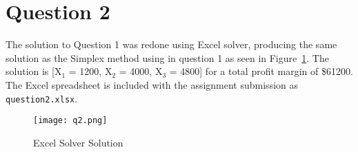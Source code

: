 \section*{Question 2}
The solution to Question 1 was redone using Excel solver, producing the same solution as the Simplex method using in question 1 as seen in Figure~\ref{fig:q2}. The solution is [X$_1$ = 1200, X$_2$ = 4000, X$_3$ = 4800] for a total profit margin of \$61200. The Excel spreadsheet is included with the assignment submission as \texttt{question2.xlsx}.

\begin{figure}[htp]
    \centering
    \texttt{[image: q2.png]}
    \caption{\label{fig:q2}Excel Solver Solution}
\end{figure}